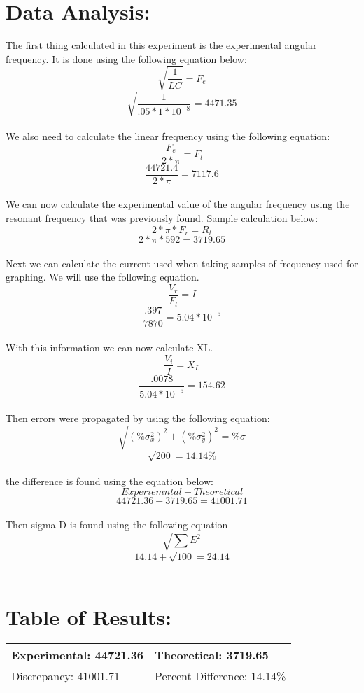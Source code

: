 \documentclass{article}
\begin{document}
\section*{Data Analysis:}
\setcounter{page}{3}
The first thing calculated in this experiment is the experimental angular frequency.  It is done using the following equation below:
\[\sqrt{\frac{1}{LC}}=F_e\]
\[\sqrt{\frac{1}{.05*1*10^{-8}}}=4471.35\]
\\
We also need to calculate the linear frequency using the following equation:
\[\frac{F_e}{2*\pi}=F_l\]
\[\frac{44721.4}{2*\pi}=7117.6\]
\\
We can now calculate the experimental value of the angular frequency using the resonant frequency that was previously found.  Sample calculation below:
\[2*\pi*F_r = R_t\]
\[2*\pi*592=3719.65\]
\\
Next we can calculate the current used when taking samples of frequency used for graphing.  We will use the following equation.
\[\frac{V_r}{F_l	} = \textit{I}\]
\[\frac{.397}{7870}=5.04*10^{-5}\]
\\
With this information we can now calculate XL.
\[\frac{V_i}{\textit{I}} = X_L\]
\[\frac{.0078}{5.04*10^{-5}}=154.62\]
\\
Then errors were propagated by using the following equation:
\[\sqrt{(\%\sigma^2_x)^2+(\%\sigma^2_y)^2}=\%\sigma\]
\[\sqrt{200}= 14.14\%\]
\\
the difference is found using the equation below:
\[Experiemntal - Theoretical\]
\[44721.36 - 3719.65 = 41001.71\]
\\
Then sigma D is found using the following equation
\[\sqrt{\sum{E^2}}\]
\[14.14+\sqrt{100} = 24.14\]
\\
\newpage

\section*{Table of Results:}
\begin{center}
\begin{tabular}{|l|l|}
\hline
	Experimental: 44721.36 & Theoretical: 3719.65  \\ \hline
	Discrepancy: 41001.71   & Percent Difference: 14.14\% \\
\hline
\end{tabular}
\end{center}
\end{document}
